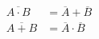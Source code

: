 

\vspace*{\fill}
\centering

\begin{align*}
    \overline{A \cdot B} &= \overline{A} + \overline{B} \\
    \overline{A + B} &= \overline{A} \cdot \overline{B}
\end{align*}

\centering
\vspace*{\fill}

